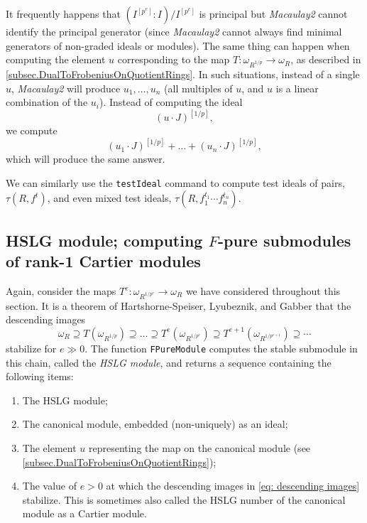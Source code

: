 \documentclass{amsart}
\begin{document}
\begin{remark}
   It frequently happens that $(I^{[p^e]} : I)/I^{[p^e]}$ is principal but \emph{Macaulay2} cannot identify the principal generator (since \emph{Macaulay2} cannot always find minimal generators of non-graded ideals or modules).
   The same thing can happen when computing the element $u$ corresponding to the map $T : \omega_{R^{1/p}} \to \omega_R$, as described in \autoref{subsec.DualToFrobeniusOnQuotientRings}.
   In such situations, instead of a single $u$, \emph{Macaulay2} will produce $u_1, \dots, u_n$ (all multiples of $u$, and $u$ is a linear combination of the $u_i$).  Instead of computing the ideal
\[
(u \cdot J)^{[1/p]},
\]
we compute
\[
(u_1 \cdot J)^{[1/p]} + \dots + (u_n \cdot J)^{[1/p]},
\]
which will produce the same answer.
\end{remark}

We can similarly use the \texttt{testIdeal} command to compute test ideals of pairs, $\tau(R, f^t)$, and even mixed test ideals, $\tau(R, f_1^{t_1} \cdots f_n^{t_n})$.

\subsection{HSLG module; computing $F$-pure submodules of rank-1 Cartier modules}

Again, consider the maps $T^e : \omega_{R^{1/p^e}} \to \omega_R$ we have considered throughout this section.  It is a theorem of Hartshorne-Speiser, Lyubeznik, and Gabber \cite{HartshorneSpeiserLocalCohomologyInCharacteristicP,LyubeznikFModulesApplicationsToLocalCohomology,Gabber.tStruc} that the descending images
\begin{equation}\label{eq: descending images}
\omega_R \supseteq T(\omega_{R^{1/p}}) \supseteq \dots \supseteq T^e(\omega_{R^{1/p^e}}) \supseteq T^{e+1}(\omega_{R^{1/p^{e+1}}}) \supseteq \cdots
\end{equation}
stabilize for $e \gg 0$.
The function \texttt{FPureModule} computes the stable submodule in this chain, called the \emph{HSLG module}, and returns a sequence containing the following items:
\begin{enumerate}[(1)]
   \item The HSLG module;
   \item The canonical module, embedded (non-uniquely) as an ideal;
   \item The element $u$ representing the map on the canonical module (see
   \autoref{subsec.DualToFrobeniusOnQuotientRings});
   \item The value of $e > 0$ at which the descending images in \eqref{eq: descending images} stabilize.  This is sometimes also called the HSLG number of the canonical module as a Cartier module.
\end{enumerate}
\end{document}
